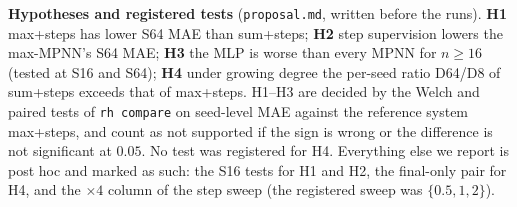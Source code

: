 \textbf{Hypotheses and registered tests} (\texttt{proposal.md}, written before the runs). \textbf{H1} max+steps has lower S64 MAE than sum+steps; \textbf{H2} step supervision lowers the max-MPNN's S64 MAE; \textbf{H3} the MLP is worse than every MPNN for $n\ge16$ (tested at S16 and S64); \textbf{H4} under growing degree the per-seed ratio D64/D8 of sum+steps exceeds that of max+steps. H1--H3 are decided by the Welch and paired tests of \texttt{rh compare} on seed-level MAE against the reference system max+steps, and count as not supported if the sign is wrong or the difference is not significant at $0.05$. No test was registered for H4. Everything else we report is post hoc and marked as such: the S16 tests for H1 and H2, the final-only pair for H4, and the $\times4$ column of the step sweep (the registered sweep was $\{0.5,1,2\}$).

